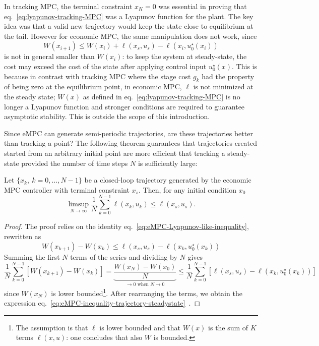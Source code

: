 In tracking MPC, the terminal constraint $x_K=0$ was essential in proving that eq.~\eqref{eq:lyapunov-tracking-MPC} was a Lyapunov function for the plant. The key idea was that a valid new trajectory would keep the state close to equilibrium at the tail. However for economic MPC, the same manipulation does not work, since
\begin{equation}
  \label{eq:eMPC-Lyapunov-like-inequality}
  W(x_{i+1}) \le W(x_i) + \ell(x_s,u_s) - \ell(x_i,u_0^\star(x_i))
\end{equation}
is not in general smaller than $W(x_i)$: to keep the system at steady-state, the cost may exceed the cost of the state after applying control input $u_0^\star(x)$. This is because in contrast with tracking MPC where the stage cost $g_k$ had the property of being zero at the equilibrium point, in economic MPC, $\ell$ is not minimized at the steady state; $W(x)$ as defined in eq.~\eqref{eq:lyapunov-tracking-MPC} is no longer a Lyapunov function and stronger conditions are required to guarantee asymptotic stability. This is outside the scope of this introduction.

Since eMPC can generate semi-periodic trajectories, are these trajectories better than tracking a point? The following theorem guarantees that trajectories created started from an arbitrary initial point are more efficient that tracking a steady-state provided the number of time steps $N$ is sufficiently large:
\begin{theorem}
  Let $\{x_k,\ k=0,\ldots,N-1\}$ be a closed-loop trajectory generated by the economic MPC controller with terminal constraint $x_s$. Then, for any initial condition $x_0$
  \begin{equation}
    \label{eq:eMPC-inequality-trajectory-steadystate}
    \limsup_{N\rightarrow \infty} \frac{1}{N} \sum_{k=0}^{N-1} \ell(x_k,u_k) \le \ell(x_s,u_s).
  \end{equation}
\end{theorem}
\begin{proof}
  The proof relies on the identity eq.~\eqref{eq:eMPC-Lyapunov-like-inequality}, rewritten as
  \begin{equation*}
    W(x_{k+1}) - W(x_k) \le \ell(x_s,u_s) - \ell(x_k,u_0^\star(x_k))
  \end{equation*}
  Summing the first $N$ terms of the series and dividing by $N$ gives
  \begin{equation*}
    \frac{1}{N}\sum_{k=0}^{N-1} \left[W(x_{k+1}) - W(x_k)\right] = \underbrace{\frac{W(x_N) - W(x_0)}{N}}_{\rightarrow 0 \text{ when } N\rightarrow 0} \le \frac{1}{N}\sum_{k=0}^{N-1}  \left[\ell(x_s,u_s) - \ell(x_k,u_0^\star(x_k))\right]
  \end{equation*}
  since $W(x_N)$ is lower bounded\footnote{The assumption is that $\ell$ is lower bounded and that $W(x)$ is the sum of $K$ terms $\ell(x,u)$: one concludes that also $W$ is bounded.}. After rearranging the terms, we obtain the expression eq.~\eqref{eq:eMPC-inequality-trajectory-steadystate}~\cite[Sect.~2.8.1]{MPC-diehl}.
\end{proof}

